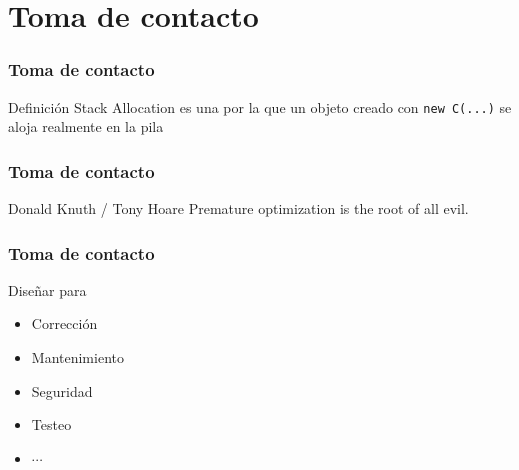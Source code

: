 

\section{Toma de contacto}
\def\ft{Toma de contacto}




\begin{frame}[fragile]
  \frametitle{\ft}
  \begin{block}{Definición}
    Stack Allocation es una
    por la que un objeto creado con {\tt new~C(...)}
    se aloja realmente en la pila
  \end{block}
\end{frame}

\begin{frame}[fragile]
  \frametitle{\ft}
  \begin{block}{Donald Knuth / Tony Hoare}
    {Premature optimization is the root of all evil.}
  \end{block}
\end{frame}

\begin{frame}[fragile]
  \frametitle{\ft}
  \begin{block}{Diseñar para}
    \begin{itemize}
    \item Corrección
    \item Mantenimiento
    \item Seguridad
    \item Testeo
    \item $\cdots$
    \end{itemize}
  \end{block}
\end{frame}
